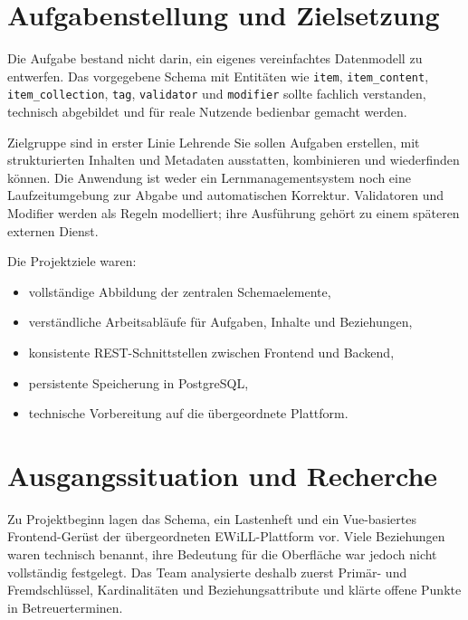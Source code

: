 ﻿\documentclass[11pt,a4paper]{article}
\begin{document}
\section{Aufgabenstellung und Zielsetzung}
Die Aufgabe bestand nicht darin, ein eigenes vereinfachtes Datenmodell zu
entwerfen. Das vorgegebene Schema mit Entitäten wie \texttt{item},
\texttt{item\_content}, \texttt{item\_collection}, \texttt{tag},
\texttt{validator} und \texttt{modifier} sollte fachlich verstanden,
technisch abgebildet und für reale Nutzende bedienbar gemacht werden.

Zielgruppe sind in erster Linie Lehrende Sie
sollen Aufgaben erstellen, mit strukturierten Inhalten und Metadaten
ausstatten, kombinieren und wiederfinden können. Die Anwendung ist weder ein
Lernmanagementsystem noch eine Laufzeitumgebung zur Abgabe und automatischen
Korrektur. Validatoren und Modifier werden als Regeln modelliert; ihre
Ausführung gehört zu einem späteren externen Dienst.

Die Projektziele waren:
\begin{itemize}
\item vollständige Abbildung der zentralen Schemaelemente,
\item verständliche Arbeitsabläufe für Aufgaben, Inhalte und Beziehungen,
\item konsistente REST-Schnittstellen zwischen Frontend und Backend,
\item persistente Speicherung in PostgreSQL,
\item technische Vorbereitung auf die übergeordnete Plattform.
\end{itemize}

\section{Ausgangssituation und Recherche}
Zu Projektbeginn lagen das Schema, ein Lastenheft und ein Vue-basiertes
Frontend-Gerüst der übergeordneten EWiLL-Plattform vor. Viele Beziehungen
waren technisch benannt, ihre Bedeutung für die Oberfläche war jedoch nicht
vollständig festgelegt. Das Team analysierte deshalb zuerst Primär- und
Fremdschlüssel, Kardinalitäten und Beziehungsattribute und klärte offene
Punkte in Betreuerterminen.
\end{document}

